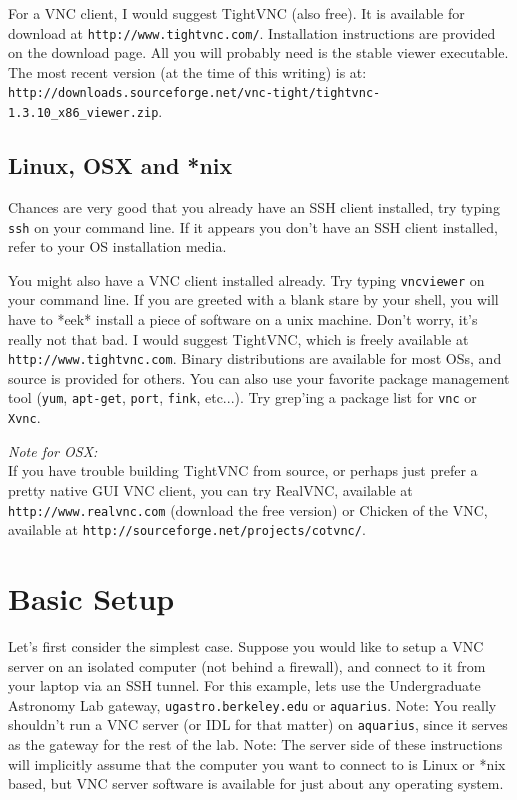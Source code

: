\documentclass[11pt,preprint]{aastex}
\begin{document}
For a VNC client, I would suggest TightVNC (also free).  It is available for download at \verb$http://www.tightvnc.com/$.  Installation instructions are
provided on the download page.  All you will probably need is the stable viewer executable.  The most recent version (at the time of this writing) is at: 
\verb$http://downloads.sourceforge.net/vnc-tight/tightvnc-1.3.10_x86_viewer.zip$.

\subsection{Linux, OSX and *nix}
Chances are very good that you already have an SSH client installed, try typing \verb$ssh$ on your command line.  If it appears you don't have an SSH client installed, refer to your OS installation media.

You might also have a VNC client installed already.  Try typing \verb$vncviewer$ on your command line.  If you are greeted with a blank stare by your shell, you will have to *eek* install a piece of software on a unix machine.  Don't worry, it's really not that 
bad.  I would suggest TightVNC, which is freely available at \verb$http://www.tightvnc.com$.  Binary distributions are available for most OSs, and source is provided 
for others.  You can also use your favorite package management tool (\verb$yum$, \verb$apt-get$, \verb$port$, \verb$fink$, etc...).  Try grep'ing a package list for \verb$vnc$ or \verb$Xvnc$.

\emph{Note for OSX:}\\
If you have trouble building TightVNC from source, or perhaps just prefer a pretty native GUI VNC client, you can try RealVNC, available at \verb$http://www.realvnc.com$
(download the free version) or Chicken of the VNC, available at \verb$http://sourceforge.net/projects/cotvnc/$.


\section{Basic Setup}

Let's first consider the simplest case.  Suppose you would like to setup a VNC server on an isolated computer (not behind a firewall), and connect to it
from your laptop via an SSH tunnel.  For this example, lets use the Undergraduate Astronomy Lab gateway, \verb$ugastro.berkeley.edu$ or \verb$aquarius$.  Note: You really
shouldn't run a VNC server (or IDL for that matter) on \verb$aquarius$, since it serves as the gateway for the rest of the lab.  Note: The server side of these instructions will implicitly assume that
the computer you want to connect to is Linux or *nix based, but VNC server software is available for just about any operating system.
\end{document}
